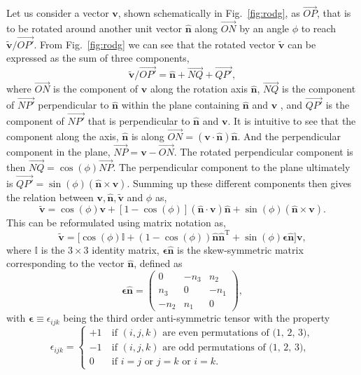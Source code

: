 \documentclass{article}
\def\nh{\hat{\mathbf{n}}}
\def\v{\mathbf{v}}
\def\vt{\tilde{\mathbf{v}}}
\def\I{\mathbb{I}}
\def\nh{\hat{\mathbf{n}}}
\begin{document}
Let us consider a vector $\v$, shown schematically in Fig.~\ref{fig:rodg}, as $\overrightarrow{OP}$, that is to be rotated around another unit vector $\nh$ along $\overrightarrow{ON}$ by an angle \( \phi \) to reach \( \vt / \overrightarrow{OP'} \). From Fig.~\ref{fig:rodg} we can see that the rotated vector \( \vt \) can be expressed as the sum of three components,
\begin{equation}
     \vt / \overrightarrow{OP'} = \nh + \overrightarrow{NQ} + \overrightarrow{QP'},
\end{equation}
\noindent where \( \overrightarrow{ON} \) is the component of $\v$ along the rotation axis $\nh$, \( \overrightarrow{NQ} \) is the component of \( \overrightarrow{NP'} \)  perpendicular to $\nh$ within the plane containing $\nh$ and $\v$ , and \( \overrightarrow{QP'} \) is the component of \( \overrightarrow{NP'} \) that is perpendicular to $\nh$ and $\v$. It is intuitive to see that the component along the axis, $\nh$ is along $\overrightarrow{ON} = (\v \cdot \nh) \nh$. And the perpendicular component in the plane, $\overrightarrow{NP} = \v - \overrightarrow{ON}$. The rotated perpendicular component is then $\overrightarrow{NQ} = \cos(\phi) \overrightarrow{NP}$. The perpendicular component to the plane ultimately is $\overrightarrow{QP'} = \sin(\phi) (\nh \times \v)$. Summing up these different components then gives the relation between $\v, \nh, \vt$ and $\phi$ as,
\begin{equation}
    \vt  = \cos(\phi) \v + [1 - \cos(\phi)] (\nh \cdot \v) \nh + \sin(\phi) (\nh \times \v).
\end{equation}
This can be reformulated using matrix notation as,
\begin{equation}
\vt = \big[\cos(\phi) \I + (1 - \cos(\phi))\hat{\mathbf{n}}\hat{\mathbf{n}}^\text{T} + \sin(\phi) \bm{\epsilon} \nh \big] \v,
\end{equation}
where \(\I\) is the $3 \times 3$ identity matrix, $\bm{\epsilon} \nh$ is the skew-symmetric matrix corresponding to the vector $\nh$, defined as
\begin{equation}
\bm{\epsilon} \nh = \begin{pmatrix}
0 & -n_3 & n_2 \\
n_3 & 0 & -n_1 \\
-n_2 & n_1 & 0
\end{pmatrix},
\end{equation}
with $\bm{\epsilon} \equiv \epsilon_{ijk}$ being the third order anti-symmetric tensor with the property
\[
  \epsilon_{ijk} = \begin{cases}
    +1 & \ \text{if $(i,j,k)$ are even permutations of (1, 2, 3)}, \\
    -1 & \ \text{if $(i,j,k)$ are odd permutations of (1, 2, 3)}, \\
    0 & \ \text{if $i=j$ or $j=k$ or $i=k$}.
  \end{cases}
\]
\end{document}
